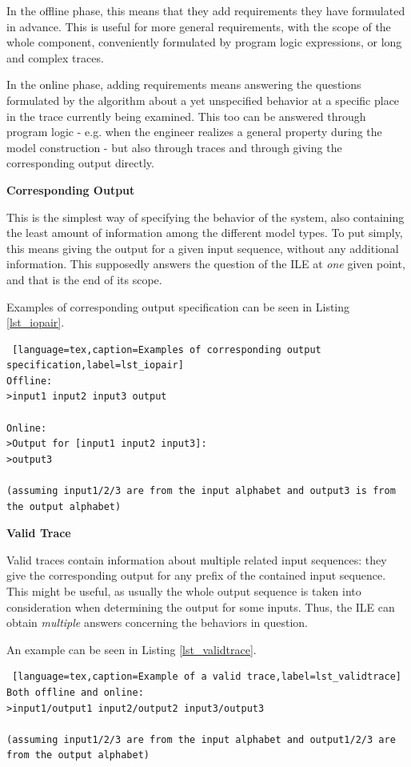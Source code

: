 In the offline phase, this means that they add requirements they have formulated in advance. This is useful for more general requirements, with the scope of the whole component, conveniently formulated by program logic expressions, or long and complex traces.

In the online phase, adding requirements means answering the questions formulated by the algorithm about a yet unspecified behavior at a specific place in the trace currently being examined. This too can be answered through program logic - e.g. when the engineer realizes a general property during the model construction - but also through traces and through giving the corresponding output directly.

\textbf{Corresponding Output}

This is the simplest way of specifying the behavior of the system, also containing the least amount of information among the different model types. To put simply, this means giving the output for a given input sequence, without any additional information. This supposedly answers the question of the ILE at \textit{one} given point, and that is the end of its scope.

Examples of corresponding output specification can be seen in Listing \ref{lst_iopair}.

\bigskip
\begin{lstlisting} [language=tex,caption=Examples of corresponding output specification,label=lst_iopair]
Offline: 
>input1 input2 input3 output

Online: 
>Output for [input1 input2 input3]:
>output3

(assuming input1/2/3 are from the input alphabet and output3 is from the output alphabet)
\end{lstlisting}

\textbf{Valid Trace}

Valid traces contain information about multiple related input sequences: they give the corresponding output for any prefix of the contained input sequence. This might be useful, as usually the whole output sequence is taken into consideration when determining the output for some inputs. Thus, the ILE can obtain \textit{multiple} answers concerning the behaviors in question.

An example can be seen in Listing \ref{lst_validtrace}.

\bigskip
\begin{lstlisting} [language=tex,caption=Example of a valid trace,label=lst_validtrace]
Both offline and online:
>input1/output1 input2/output2 input3/output3

(assuming input1/2/3 are from the input alphabet and output1/2/3 are from the output alphabet) 
\end{lstlisting}

